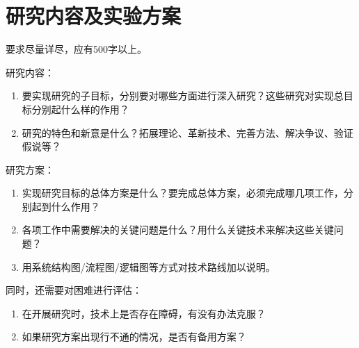 %
%
%
%

\section{研究内容及实验方案}
要求尽量详尽，应有500字以上。

研究内容：
\begin{enumerate}[label=\arabic*)]
    \item 要实现研究的子目标，分别要对哪些方面进行深入研究？这些研究对实现总目标分别起什么样的作用？
    \item 研究的特色和新意是什么？拓展理论、革新技术、完善方法、解决争议、验证假说等？
\end{enumerate}

研究方案：
\begin{enumerate}[label=\arabic*)]
    \item 实现研究目标的总体方案是什么？要完成总体方案，必须完成哪几项工作，分别起到什么作用？
    \item 各项工作中需要解决的关键问题是什么？用什么关键技术来解决这些关键问题？
    \item 用系统结构图/流程图/逻辑图等方式对技术路线加以说明。
\end{enumerate}

同时，还需要对困难进行评估：
\begin{enumerate}[label=\arabic*)]
    \item 在开展研究时，技术上是否存在障碍，有没有办法克服？
    \item 如果研究方案出现行不通的情况，是否有备用方案？
\end{enumerate}